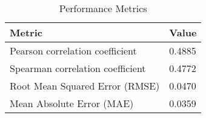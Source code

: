 \documentclass{article}
\begin{document}
\begin{table}[h!]
\centering
\begin{tabular}{ll}
\toprule
Metric & Value \\
\midrule
Pearson correlation coefficient & 0.4885 \\
Spearman correlation coefficient & 0.4772 \\
Root Mean Squared Error (RMSE) & 0.0470 \\
Mean Absolute Error (MAE) & 0.0359 \\
\bottomrule
\end{tabular}
\caption{Performance Metrics}
\label{tab:metrics}
\end{table}
\end{document}
